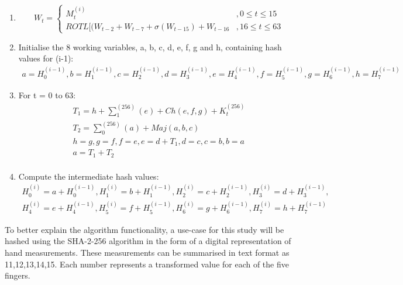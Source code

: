     \begin{enumerate}
        
        \item \[W_t=\begin{cases}
                        M^{(i)}_t &, 0 \leq t \leq 15\\
                        ROTL[(W_{t-2} + W_{t-7} + \sigma(W_{t-15}) + W_{t-16}  &, 16 \leq t \leq 63
                        \end{cases}\]
 
        
        \item Initialise the 8 working variables, a, b, c, d, e, f, g and h, containing hash values for (i-1): 
            \begin{gather*}     
                a = H^{(i-1)}_0, b = H^{(i-1)}_1, c = H^{(i-1)}_2, d = H^{(i-1)}_3, e = H^{(i-1)}_4, f = H^{(i-1)}_5, g = H^{(i-1)}_6, h = H^{(i-1)}_7 
            \end{gather*}
        \item For t = 0 to 63:
            \begin{gather*}
                T_1 = h + \sum_{1}^{(256)}(e) + Ch(e,f,g) + K^{(256)}_t \\
                T_2 = \sum_{0}^{(256)}(a) + Maj(a,b,c) \\
                h = g, g = f, f = e, e = d + T_1, d = c, c = b, b = a \\
                a = T_1 + T_2 \\
            \end{gather*}
        
        \item Compute the intermediate hash values:
            \begin{gather*}
                H^{(i)}_0 = a + H^{(i-1)}_0, H^{(i)}_1 = b + H^{(i-1)}_1, H^{(i)}_2 = c + H^{(i-1)}_2, H^{(i)}_3 = d + H^{(i-1)}_3, \\ 
                H^{(i)}_4 = e + H^{(i-1)}_4, H^{(i)}_5 = f + H^{(i-1)}_5, H^{(i)}_6 = g + H^{(i-1)}_6, H^{(i)}_7 = h + H^{(i-1)}_7
            \end{gather*}
    \end{enumerate}
    
    To better explain the algorithm functionality, a use-case for this study will be hashed using the SHA-2-256 algorithm in the form of a digital representation of hand measurements. These measurements can be summarised in text format as 11,12,13,14,15. Each number represents a transformed value for each of the five fingers.
    
